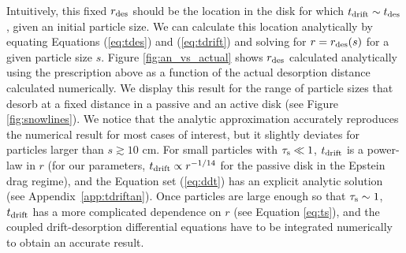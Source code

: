 \documentclass[apj]{emulateapj}
\newcommand{\App}[1]{Appendix~\ref{#1}}
\newcommand{\emgr}[1]{\emph{ \color{gray} #1}}
\begin{document}
Intuitively, this fixed $r_{\rm des}$ should be the location in the disk for which $t_{\rm drift} \sim t_{\rm des}$, given an initial particle size. We can calculate this location analytically by equating Equations (\ref{eq:tdes}) and (\ref{eq:tdrift}) and solving for $r=r_{\rm des}(s)$ for a given particle size $s$. Figure \ref{fig:an_vs_actual} shows $r_{\rm des}$ calculated analytically using the prescription above as a function of the actual desorption distance calculated numerically. We display this result for the range of particle sizes that desorb at a fixed distance in a passive and an active disk (see Figure \ref{fig:snowlines}). We notice that the analytic approximation accurately reproduces the numerical result for most cases of interest, but it slightly deviates for particles larger than $s \gtrsim10$ cm. For small particles with $\tau_{\rm s} \ll 1$, $t_{\rm drift}$ is a power-law in $r$ (for our parameters, $t_{\rm drift} \propto r^{-1/14}$ for the passive disk in the Epstein drag regime), and the Equation set (\ref{eq:ddt}) has an explicit analytic solution (see \App{app:tdriftan}). Once particles are large enough so that $\tau_{\rm s} \sim 1$, $t_{\rm drift}$ has a more complicated dependence on $r$ (see Equation \ref{eq:ts}), and the coupled drift-desorption differential equations have to be integrated numerically to obtain an accurate result. 





\end{document}
